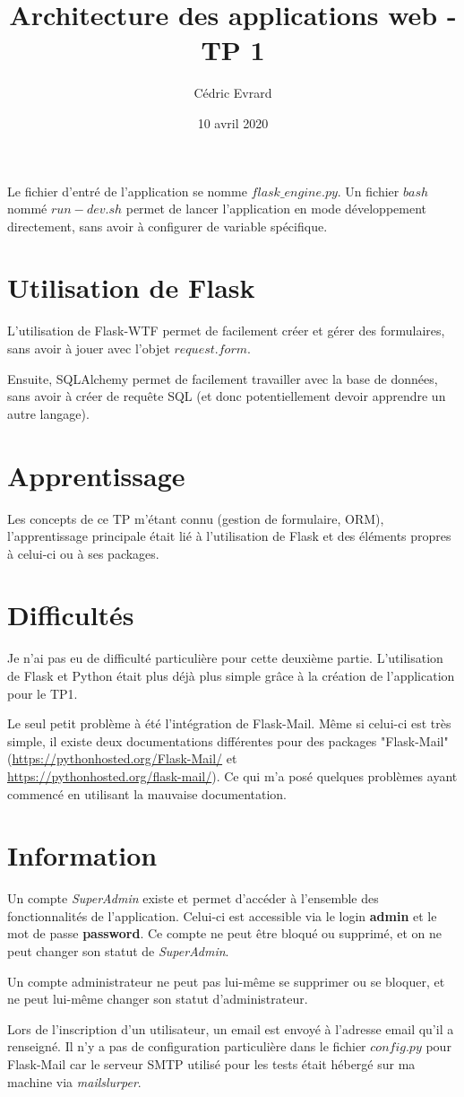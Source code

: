 \documentclass{article}
\title{Architecture des applications web - TP 1}
\author{Cédric Evrard}
\date{10 avril 2020}
\begin{document}
\maketitle

Le fichier d'entré de l'application se nomme $flask\_engine.py$. Un fichier $bash$ nommé $run-dev.sh$ permet de lancer l'application en mode développement directement, sans avoir à configurer de variable spécifique.

\section{Utilisation de Flask}
L'utilisation de Flask-WTF permet de facilement créer et gérer des formulaires, sans avoir à jouer avec l'objet $request.form$.

Ensuite, SQLAlchemy permet de facilement travailler avec la base de données, sans avoir à créer de requête SQL (et donc potentiellement devoir apprendre un autre langage).

\section{Apprentissage}
Les concepts de ce TP m'étant connu (gestion de formulaire, ORM), l'apprentissage principale était lié à l'utilisation de Flask et des éléments propres à celui-ci ou à ses packages.

\section{Difficultés}
Je n'ai pas eu de difficulté particulière pour cette deuxième partie. L'utilisation de Flask et Python était plus déjà plus simple grâce à la création de l'application pour le TP1.

Le seul petit problème à été l'intégration de Flask-Mail. Même si celui-ci est très simple, il existe deux documentations différentes pour des packages "Flask-Mail" (\hyperref[https://pythonhosted.org/Flask-Mail/]{https://pythonhosted.org/Flask-Mail/} et\\ \hyperref[https://pythonhosted.org/flask-mail/]{https://pythonhosted.org/flask-mail/}). Ce qui m'a posé quelques problèmes ayant commencé en utilisant la mauvaise documentation.

\section{Information}
Un compte \emph{SuperAdmin} existe et permet d'accéder à l'ensemble des fonctionnalités de l'application. Celui-ci est accessible via le login \textbf{admin} et le mot de passe \textbf{password}. Ce compte ne peut être bloqué ou supprimé, et on ne peut changer son statut de \emph{SuperAdmin}.

Un compte administrateur ne peut pas lui-même se supprimer ou se bloquer, et ne peut lui-même changer son statut d'administrateur.

Lors de l'inscription d'un utilisateur, un email est envoyé à l'adresse email qu'il a renseigné. Il n'y a pas de configuration particulière dans le fichier $config.py$ pour Flask-Mail car le serveur SMTP utilisé pour les tests était hébergé sur ma machine via \emph{mailslurper}.
\end{document}

